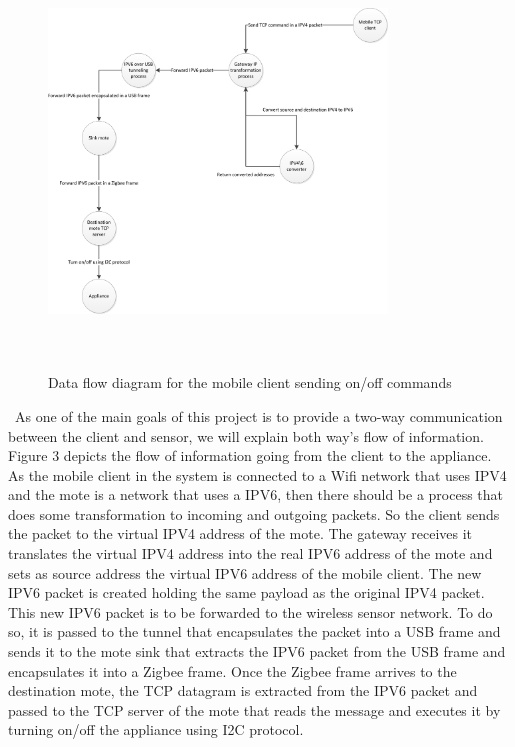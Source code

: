 \documentclass[conference]{IEEEtran}
\begin{document}
\begin{figure}[htbp]
\centering
\includegraphics[height=110mm,width=90mm]{images/control_appliance_data_flow.jpg}
\caption{Data flow diagram for the mobile client sending on/off commands}
\label{fig:control_appliance}
\end{figure}

\
As one of the main goals of this project is to provide a two-way communication between the client and sensor, we will explain both way's flow of information. Figure 3 depicts the flow of information going from the client to the appliance. As the mobile client in the system is connected to a Wifi network that uses IPV4 and the mote is a network that uses a IPV6, then there should be a process that does some transformation to incoming and outgoing packets. So the client sends the packet to the virtual IPV4 address of the mote. The gateway receives it translates the virtual IPV4 address into the real IPV6 address of the mote and sets as source address the virtual IPV6 address of the mobile client. The new IPV6 packet is created holding the same payload as the original IPV4 packet. This new IPV6 packet is to be forwarded to the wireless sensor network. To do so, it is passed to the tunnel that encapsulates the packet into a USB frame and sends it to the mote sink that extracts the IPV6 packet from the USB frame and encapsulates it into a Zigbee frame. Once the Zigbee frame arrives to the destination mote, the TCP datagram is extracted from the IPV6 packet and passed to the TCP server of the mote that reads the message and executes it by turning on/off the appliance using I2C protocol.
\end{document}

